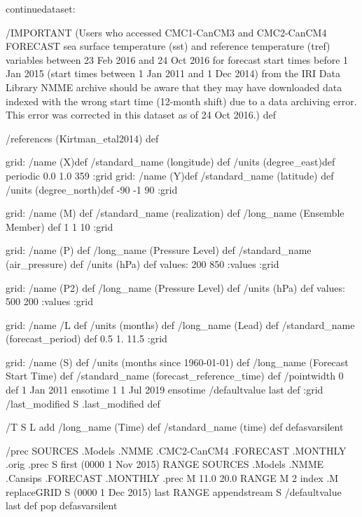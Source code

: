\begin{ingrid}
continuedataset:

/IMPORTANT (Users who accessed CMC1-CanCM3 and CMC2-CanCM4 FORECAST sea surface temperature (sst) and reference temperature (tref) variables between 23 Feb 2016 and 24 Oct 2016 for forecast start times before 1 Jan 2015 (start times between 1 Jan 2011 and 1 Dec 2014) from the IRI Data Library NMME archive should be aware that they may have downloaded data indexed with the wrong start time (12-month shift) due to a data archiving error.  This error was corrected in this dataset as of 24 Oct 2016.) def

/references (Kirtman_etal2014) def

grid:
/name (X)def
/standard_name (longitude) def
/units (degree_east)def
periodic
 0.0 1.0 359
:grid
grid:
/name (Y)def
/standard_name (latitude) def
/units (degree_north)def
-90 -1 90
:grid

grid:
/name (M) def
/standard_name (realization) def
/long_name (Ensemble Member) def
1 1 10
:grid

grid:
/name (P) def
/long_name (Pressure Level) def
/standard_name (air_pressure) def
/units (hPa) def
values: 200 850 :values
:grid

grid:
/name (P2) def
/long_name (Pressure Level) def
/units (hPa) def
values: 500 200 :values
:grid

grid:
/name /L def
/units (months) def
/long_name (Lead) def
/standard_name (forecast_period) def
0.5 1. 11.5
:grid

grid:
/name (S) def
/units (months since 1960-01-01) def
/long_name (Forecast Start Time) def
/standard_name (forecast_reference_time) def
/pointwidth 0 def
1 Jan 2011 ensotime
1
1 Jul 2019 ensotime
/defaultvalue { last } def
:grid
/last_modified S .last_modified def

/T { S L add
/long_name (Time) def
/standard_name (time) def } defasvarsilent

/prec {
 SOURCES .Models .NMME .CMC2-CanCM4 .FORECAST .MONTHLY .orig .prec
S first (0000 1 Nov 2015) RANGE
 SOURCES .Models .NMME .Cansips .FORECAST .MONTHLY .prec
 M 11.0 20.0 RANGE
 M 2 index .M replaceGRID
S (0000 1 Dec 2015) last RANGE
appendstream
S /defaultvalue last def pop
} defasvarsilent


\end{ingrid}
